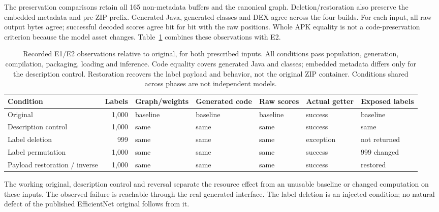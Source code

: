 \documentclass[10pt,conference]{IEEEtran}
\begin{document}
The preservation comparisons retain all 165 non-metadata buffers and the canonical graph. Deletion/restoration also preserve the embedded metadata and pre-ZIP prefix. Generated Java, generated classes and DEX agree across the four builds. For each input, all raw output bytes agree; successful decoded scores agree bit for bit with the raw positions. Whole APK equality is not a code-preservation criterion because the model asset changes. Table~\ref{tab:core} combines these observations with E2.

\begin{table}[t]
\caption{Recorded E1/E2 observations relative to original, for both prescribed inputs. All conditions pass population, generation, compilation, packaging, loading and inference. Code equality covers generated Java and classes; embedded metadata differs only for the description control. Restoration recovers the label payload and behavior, not the original ZIP container. Conditions shared across phases are not independent models.}
\label{tab:core}
\centering\small
\setlength{\tabcolsep}{5pt}
\begin{tabular}{@{}lrlllll@{}}
\toprule
Condition & Labels & Graph/weights & Generated code & Raw scores & Actual getter & Exposed labels\\
\midrule
Original & 1,000 & baseline & baseline & baseline & success & baseline\\
Description control & 1,000 & same & same & same & success & same\\
Label deletion & 999 & same & same & same & exception & not returned\\
Label permutation & 1,000 & same & same & same & success & 999 changed\\
Payload restoration / inverse & 1,000 & same & same & same & success & restored\\
\bottomrule
\end{tabular}
\end{table}

The working original, description control and reversal separate the resource effect from an unusable baseline or changed computation on these inputs. The observed failure is reachable through the real generated interface. The label deletion is an injected condition; no natural defect of the published EfficientNet original follows from it.
\end{document}
